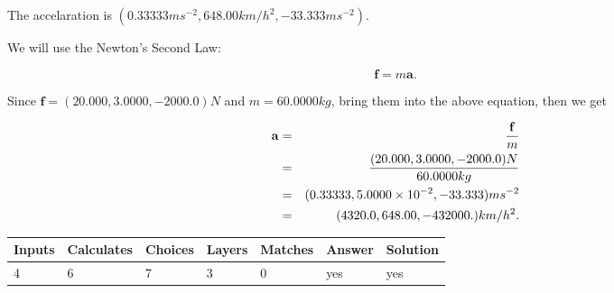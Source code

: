 \documentclass[12pt]{article}
\begin{document}
 
The accelaration is
$(
0.33333ms^{-2},
648.00km/h^2,
-33.333ms^{-2}
).
$
 
 
\noindent{}
 
 
 
 
 
 
\noindent{}
 
 

We will use the Newton's Second Law:
 
\[
\mathbf{f}=m\mathbf{a}.
\]
 
Since $\mathbf{f}=( %
20.000,  %
3.0000,  %
-2000.0 )N$
and $m= %
60.0000kg$, bring them into the above equation, then we get
 
\begin{eqnarray*}
\mathbf{a}&=&\frac{\mathbf{f}}m  \\
&=&\frac{(
20.000 ,
3.0000 ,
-2000.0 )N
}{ %
60.0000 kg}  \\
&=&(
0.33333 ,
5.0000 \times 10^{-2},
-33.333
)ms^{-2} \\
&=&(
4320.0 ,
648.00 ,
-432000.
)km/h^2.
\end{eqnarray*}
 
 
 
\noindent{}
 
 

 
\vspace{0.3in}
   
   
   
   
\noindent\begin{tabular}{|l|l|l|l|l|l|l|}
 \hline
Inputs & Calculates & Choices & Layers & Matches & Answer & Solution \\ \hline
           4  & 
           6  & 
           7
  & 
           3  & 
           0  & 
  yes & 
  yes 
  \\ \hline
 \end{tabular}
   
   
   
   
\noindent{}
   
   
  
\end{document}
